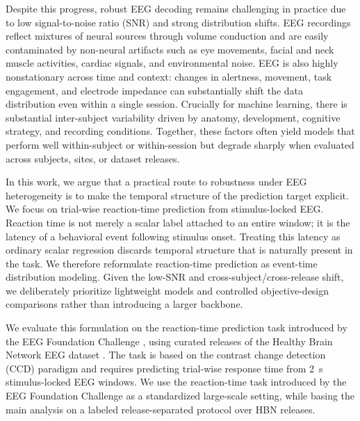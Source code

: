 \documentclass[12pt]{article}
\begin{document}
Despite this progress, robust EEG decoding remains challenging in practice due to low signal-to-noise ratio (SNR) and strong distribution shifts. EEG recordings reflect mixtures of neural sources through volume conduction and are easily contaminated by non-neural artifacts such as eye movements, facial and neck muscle activities, cardiac signals, and environmental noise. EEG is also highly nonstationary across time and context: changes in alertness, movement, task engagement, and electrode impedance can substantially shift the data distribution even within a single session. Crucially for machine learning, there is substantial inter-subject variability driven by anatomy, development, cognitive strategy, and recording conditions. Together, these factors often yield models that perform well within-subject or within-session but degrade sharply when evaluated across subjects, sites, or dataset releases.


In this work, we argue that a practical route to robustness under EEG heterogeneity is to make the temporal structure of the prediction target explicit. We focus on trial-wise reaction-time prediction from stimulus-locked EEG. Reaction time is not merely a scalar label attached to an entire window; it is the latency of a behavioral event following stimulus onset. Treating this latency as ordinary scalar regression discards temporal structure that is naturally present in the task. We therefore reformulate reaction-time prediction as event-time distribution modeling. Given the low-SNR and cross-subject/cross-release shift, we deliberately prioritize lightweight models and controlled objective-design comparisons rather than introducing a larger backbone.


We evaluate this formulation on the reaction-time prediction task introduced by the EEG Foundation Challenge \citep{EEGFoundationChallengeArxiv2025,EEGChallengeWebsite2025}, using curated releases of the Healthy Brain Network EEG dataset \citep{Shirazi2024HBNEEG}. The task is based on the contrast change detection (CCD) paradigm and requires predicting trial-wise response time from 2~s stimulus-locked EEG windows. We use the reaction-time task introduced by the EEG Foundation Challenge as a standardized large-scale setting, while basing the main analysis on a labeled release-separated protocol over HBN releases.
\end{document}
